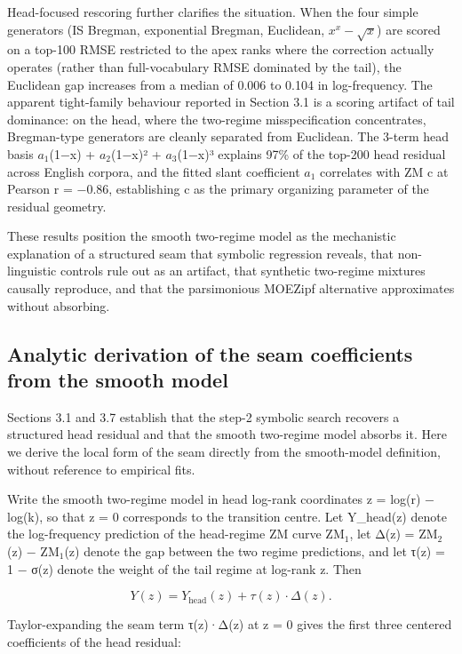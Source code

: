 \documentclass[11pt]{article}
\begin{document}
Head-focused rescoring further clarifies the situation. When the four simple generators (IS Bregman, exponential Bregman, Euclidean, $x^x-\sqrt{x}$) are scored on a top-100 RMSE restricted to the apex ranks where the correction actually operates (rather than full-vocabulary RMSE dominated by the tail), the Euclidean gap increases from a median of 0.006 to 0.104 in log-frequency. The apparent tight-family behaviour reported in Section 3.1 is a scoring artifact of tail dominance: on the head, where the two-regime misspecification concentrates, Bregman-type generators are cleanly separated from Euclidean. The 3-term head basis $a_1$(1−x) + $a_2$(1−x)² + $a_3$(1−x)³ explains 97\% of the top-200 head residual across English corpora, and the fitted slant coefficient $a_1$ correlates with ZM c at Pearson r = −0.86, establishing c as the primary organizing parameter of the residual geometry.

These results position the smooth two-regime model as the mechanistic explanation of a structured seam that symbolic regression reveals, that non-linguistic controls rule out as an artifact, that synthetic two-regime mixtures causally reproduce, and that the parsimonious MOEZipf alternative approximates without absorbing.

\subsection{Analytic derivation of the seam coefficients from the smooth model}

Sections 3.1 and 3.7 establish that the step-2 symbolic search recovers a structured head residual and that the smooth two-regime model absorbs it. Here we derive the local form of the seam directly from the smooth-model definition, without reference to empirical fits.

Write the smooth two-regime model in head log-rank coordinates z = log(r) − log(k), so that z = 0 corresponds to the transition centre. Let Y\_head(z) denote the log-frequency prediction of the head-regime ZM curve $\mathrm{ZM}_1$, let Δ(z) = $\mathrm{ZM}_2$(z) − $\mathrm{ZM}_1$(z) denote the gap between the two regime predictions, and let τ(z) = 1 − σ(z) denote the weight of the tail regime at log-rank z. Then

\begin{equation}
\tag{15}\label{eq:seam-repeat}
Y(z) = Y_{\mathrm{head}}(z) + \tau(z)\cdot \Delta(z).
\end{equation}

Taylor-expanding the seam term τ(z)·Δ(z) at z = 0 gives the first three centered coefficients of the head residual:
\end{document}
